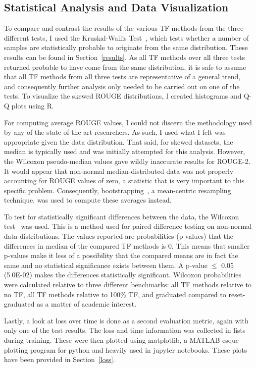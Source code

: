 \subsection{Statistical Analysis and Data Visualization}\label{stat}
To compare and contrast the results of the various TF methods from the three different tests, I used the Kruskal-Wallis Test~\cite{Kruskal1952}, which tests whether a number of samples are statistically probable to originate from the same distribution. These results can be found in Section~\ref{results}. As all TF methods over all three tests returned probable to have come from the same distribution, it is safe to assume that all TF methods from all three tests are representative of a general trend, and consequently further analysis only needed to be carried out on one of the tests. To visualize the skewed ROUGE distributions, I created histograms and Q-Q plots using R.

For computing average ROUGE values, I could not discern the methodology used by any of the state-of-the-art researchers. As such, I used what I felt was appropriate given the data distribution. That said, for skewed datasets, the median is typically used and was initially attempted for this analysis. However, the Wilcoxon pseudo-median values gave wildly inaccurate results for ROUGE-2. It would appear that non-normal median-distributed data was not properly accounting for ROUGE values of zero, a statistic that is very important to this specific problem. Consequently, bootstrapping~\cite{Davidson2003}, a mean-centric resampling technique, was used to compute these averages instead.

To test for statistically significant differences between the data, the Wilcoxon test~\cite{Wilcoxon1945} was used. This is a method used for paired difference testing on non-normal data distributions. The values reported are probabilities (p-values) that the differences in median of the compared TF methods is 0. This means that smaller p-values make it less of a possibility that the compared means are in fact the same and no statistical significance exists between them. A p-value $\leq$ 0.05 (5.0E-02) makes the differences statistically significant. Wilcoxon probabilities were calculated relative to three different benchmarks:  all TF methods relative to no TF, all TF methods relative to 100\% TF, and graduated compared to reset-graduated as a matter of academic interest.

Lastly, a look at loss over time is done as a second evaluation metric, again with only one of the test results. The loss and time information was collected in lists during training. These were then plotted using matplotlib, a MATLAB-esque plotting program for python and heavily used in jupyter notebooks. These plots have been provided in Section~\ref{loss}.